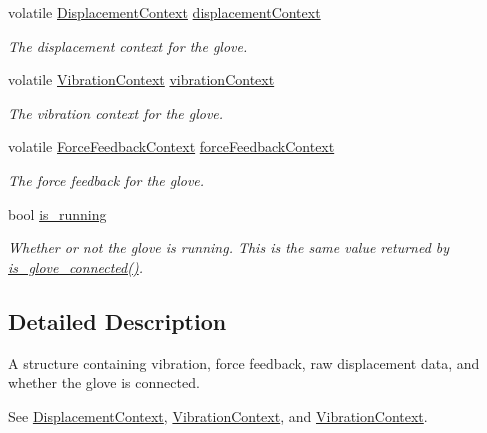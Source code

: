 \begin{DoxyCompactItemize}
\item 
\mbox{\label{struct_maestro_glove_context_ab854be82f90a440600e7b98156b4add0}} 
volatile \hyperlink{struct_displacement_context}{Displacement\+Context} \hyperlink{struct_maestro_glove_context_ab854be82f90a440600e7b98156b4add0}{displacement\+Context}
\begin{DoxyCompactList}\small\item\em The displacement context for the glove. \end{DoxyCompactList}\item 
\mbox{\label{struct_maestro_glove_context_aaea0ce977d0cbc493305f6cb52f6d8e9}} 
volatile \hyperlink{struct_vibration_context}{Vibration\+Context} \hyperlink{struct_maestro_glove_context_aaea0ce977d0cbc493305f6cb52f6d8e9}{vibration\+Context}
\begin{DoxyCompactList}\small\item\em The vibration context for the glove. \end{DoxyCompactList}\item 
\mbox{\label{struct_maestro_glove_context_a42bb0346f24c9e5e078b430af447121f}} 
volatile \hyperlink{struct_force_feedback_context}{Force\+Feedback\+Context} \hyperlink{struct_maestro_glove_context_a42bb0346f24c9e5e078b430af447121f}{force\+Feedback\+Context}
\begin{DoxyCompactList}\small\item\em The force feedback for the glove. \end{DoxyCompactList}\item 
\mbox{\label{struct_maestro_glove_context_a95cbd6b99430748422cc048b4f29dc52}} 
bool \hyperlink{struct_maestro_glove_context_a95cbd6b99430748422cc048b4f29dc52}{is\+\_\+running}
\begin{DoxyCompactList}\small\item\em Whether or not the glove is running. This is the same value returned by {\ttfamily \hyperlink{group__glove_management_ga85666868951331c5266df7559abeefbc}{is\+\_\+glove\+\_\+connected()}}. \end{DoxyCompactList}\end{DoxyCompactItemize}


\subsection{Detailed Description}
A structure containing vibration, force feedback, raw displacement data, and whether the glove is connected. 

See {\ttfamily \hyperlink{struct_displacement_context}{Displacement\+Context}}, {\ttfamily \hyperlink{struct_vibration_context}{Vibration\+Context}}, and {\ttfamily \hyperlink{struct_vibration_context}{Vibration\+Context}}. 